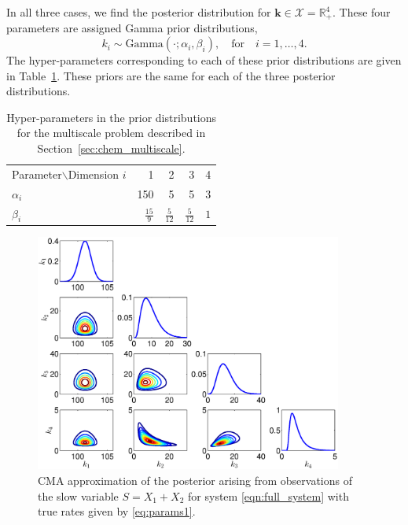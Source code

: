 \documentclass[final]{siamltex}
\begin{document}
In all three cases, we find the posterior distribution for $\mathbf{k}
\in \mathcal{X} = \mathbb{R}_+^4$. These four parameters are assigned Gamma prior distributions,
\begin{equation}
	k_i \sim \text{Gamma}(\cdot; \alpha_i, \beta_i), \quad \text{for} \quad i = 1, \dots, 4.
\end{equation}
The hyper-parameters corresponding to each of these prior distributions are given in Table~\ref{tab:multiscale_priors}. These priors are the same for each of the three posterior distributions.

\begin{table}
\centering

\begin{tabular}{lrrrr} 
	\toprule
	Parameter$\backslash$Dimension $i$ & 1 & 2 & 3 & 4  \\ \cmidrule(lr){1-5} 
	$\alpha_i$ & 150 & 5 & 5 & 3 \\
	$\beta_i$ & $\frac{15}{9}$ & $\frac{5}{12}$ & $\frac{5}{12}$ & $1$ \\ \bottomrule 
\end{tabular}
\caption{Hyper-parameters in the prior distributions for the multiscale problem described in Section~\ref{sec:chem_multiscale}.}
\label{tab:multiscale_priors}
\end{table}

\begin{figure}[htb]
\centering
\includegraphics[width=0.9\textwidth]{"images/CMA_posterior"}
\caption{CMA approximation of the posterior arising from observations of
  the slow variable $S = X_1 + X_2$ for system
  \eqref{eqn:full_system}  with true rates given by \eqref{eq:params1}.}
\label{fig:chem_CMA_posterior}
\end{figure}
\end{document}
